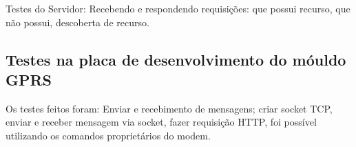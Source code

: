 Testes do Servidor:
Recebendo e respondendo requisi\c{c}\~oes: que possui recurso, que n\~ao possui, descoberta de recurso.

\subsection{Testes na placa de desenvolvimento do m\'ouldo GPRS}
Os testes feitos foram: Enviar e recebimento de mensagens; criar socket TCP, enviar e receber mensagem via socket, fazer requisi\c{c}\~ao HTTP, foi poss\'ivel utilizando os comandos propriet\'arios do modem.

